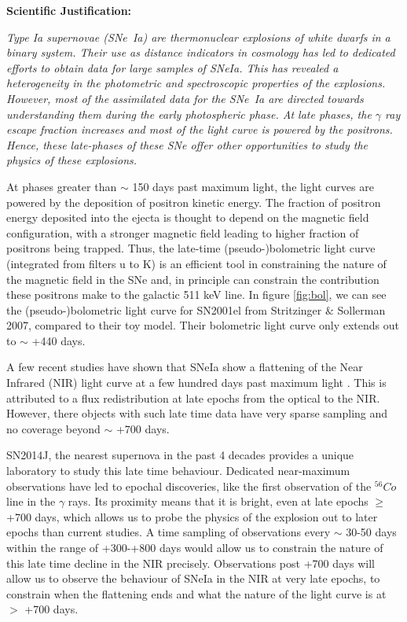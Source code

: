 \documentclass[11pt]{article}
\begin{document}
{\bf  Scientific Justification:} {\sl Type Ia supernovae (SNe~Ia) are thermonuclear explosions of white dwarfs in a binary system. Their use as distance indicators in cosmology has led to dedicated efforts to obtain data for large samples of SNeIa. This has revealed a heterogeneity in the photometric and spectroscopic properties of the explosions. However, most of the assimilated data for the SNe~Ia are directed towards understanding them during the early photospheric phase. At late phases, the $\gamma$ ray escape fraction increases and most of the light curve is powered by the positrons. Hence, these late-phases of these SNe offer other opportunities to study the physics of these explosions.

At phases greater than $\sim$ 150 days past maximum light, the light curves are powered by the deposition of positron kinetic energy. The fraction of positron energy deposited into the ejecta is thought to depend on the magnetic field configuration, with a stronger magnetic field leading to higher fraction of positrons being trapped. Thus, the late-time (pseudo-)bolometric light curve (integrated from filters u to K) is an efficient tool in constraining the nature of the magnetic field in the SNe and, in principle can constrain the contribution these positrons make to the galactic 511 keV line.  In figure \ref{fig:bol}, we can see the (pseudo-)bolometric light curve for SN2001el from Stritzinger $\&$ Sollerman 2007, compared to their toy model. Their bolometric light curve only extends out to $\sim$  +440 days.

A few recent studies have shown that SNeIa show a flattening of the Near Infrared (NIR) light curve at a few hundred days past maximum light . This is attributed to a flux redistribution at late epochs from the optical to the NIR. However, there objects with such late time data have very sparse sampling and no coverage beyond $\sim$ +700 days. 

SN2014J, the nearest supernova in the past 4 decades provides a unique laboratory to study this late time behaviour. Dedicated near-maximum observations have led to epochal discoveries, like the first observation of the $^{56}Co$ line in the $\gamma$ rays.  Its proximity means that it is bright, even at late epochs $\geq$ +700 days, which allows us to probe the physics of the explosion out to later epochs than current studies. A time sampling of observations every $\sim$ 30-50 days within the range of +300-+800 days would allow us to constrain the nature of this late time decline in the NIR precisely. Observations post +700 days will allow us to observe the behaviour of SNeIa in the NIR at very late epochs, to constrain when the flattening ends and what the nature of the light curve is at $>$ +700 days. 

}
\end{document}
